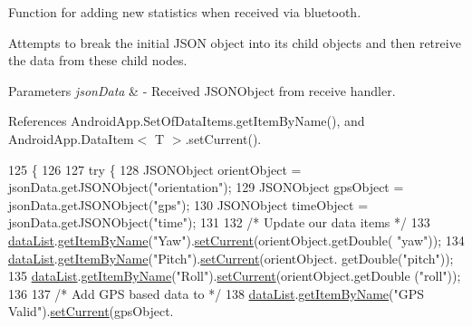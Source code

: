 Function for adding new statistics when received via bluetooth. 

Attempts to break the initial J\+S\+ON object into it\textquotesingle{}s child objects and then retreive the data from these child nodes.


\begin{DoxyParams}{Parameters}
{\em json\+Data} & -\/ Received J\+S\+O\+N\+Object from receive handler. \\
\hline
\end{DoxyParams}


References Android\+App.\+Set\+Of\+Data\+Items.\+get\+Item\+By\+Name(), and Android\+App.\+Data\+Item$<$ T $>$.\+set\+Current().


\begin{DoxyCode}
125                                                     \{
126 
127         \textcolor{keywordflow}{try} \{
128             JSONObject orientObject = jsonData.getJSONObject(\textcolor{stringliteral}{"orientation"});
129             JSONObject gpsObject = jsonData.getJSONObject(\textcolor{stringliteral}{"gps"});
130             JSONObject timeObject = jsonData.getJSONObject(\textcolor{stringliteral}{"time"});
131 
132             \textcolor{comment}{/* Update our data items */}
133             \hyperlink{class_android_app_1_1_realtime_fragment_ab1c4983b61e50b501ed22842253bf849}{dataList}.\hyperlink{class_android_app_1_1_set_of_data_items_aa559ef3701bb9f59f124ddddc56a2a38}{getItemByName}(\textcolor{stringliteral}{"Yaw"}).\hyperlink{class_android_app_1_1_data_item_a6cd8975067d5be2d5eaac137a94c0eac}{setCurrent}(orientObject.getDouble(\textcolor{stringliteral}{
      "yaw"}));
134             \hyperlink{class_android_app_1_1_realtime_fragment_ab1c4983b61e50b501ed22842253bf849}{dataList}.\hyperlink{class_android_app_1_1_set_of_data_items_aa559ef3701bb9f59f124ddddc56a2a38}{getItemByName}(\textcolor{stringliteral}{"Pitch"}).\hyperlink{class_android_app_1_1_data_item_a6cd8975067d5be2d5eaac137a94c0eac}{setCurrent}(orientObject.
      getDouble(\textcolor{stringliteral}{"pitch"}));
135             \hyperlink{class_android_app_1_1_realtime_fragment_ab1c4983b61e50b501ed22842253bf849}{dataList}.\hyperlink{class_android_app_1_1_set_of_data_items_aa559ef3701bb9f59f124ddddc56a2a38}{getItemByName}(\textcolor{stringliteral}{"Roll"}).\hyperlink{class_android_app_1_1_data_item_a6cd8975067d5be2d5eaac137a94c0eac}{setCurrent}(orientObject.getDouble
      (\textcolor{stringliteral}{"roll"}));
136 
137             \textcolor{comment}{/* Add GPS based data to */}
138             \hyperlink{class_android_app_1_1_realtime_fragment_ab1c4983b61e50b501ed22842253bf849}{dataList}.\hyperlink{class_android_app_1_1_set_of_data_items_aa559ef3701bb9f59f124ddddc56a2a38}{getItemByName}(\textcolor{stringliteral}{"GPS Valid"}).\hyperlink{class_android_app_1_1_data_item_a6cd8975067d5be2d5eaac137a94c0eac}{setCurrent}(gpsObject.

\end{DoxyCode}
